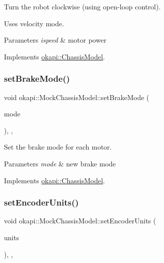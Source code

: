 Turn the robot clockwise (using open-\/loop control). 

Uses velocity mode.


\begin{DoxyParams}{Parameters}
{\em ispeed} & motor power \\
\hline
\end{DoxyParams}


Implements \mbox{\hyperlink{classokapi_1_1ChassisModel_af13aa5281c762eb61a444f0b35176014}{okapi\+::\+Chassis\+Model}}.

\mbox{\label{classokapi_1_1MockChassisModel_abf406acab7b574f508fd50596bb4f97c}} 
\subsubsection{\texorpdfstring{setBrakeMode()}{setBrakeMode()}}
{\footnotesize\ttfamily void okapi\+::\+Mock\+Chassis\+Model\+::set\+Brake\+Mode (\begin{DoxyParamCaption}\item[{\mbox{\hyperlink{classokapi_1_1AbstractMotor_a132e0485dbb59a60c3f934338d8fa601}{Abstract\+Motor\+::brake\+Mode}}}]{mode }\end{DoxyParamCaption})\hspace{0.3cm}{\ttfamily [inline]}, {\ttfamily [override]}, {\ttfamily [virtual]}}



Set the brake mode for each motor. 


\begin{DoxyParams}{Parameters}
{\em mode} & new brake mode \\
\hline
\end{DoxyParams}


Implements \mbox{\hyperlink{classokapi_1_1ChassisModel_a20e3cde96d536e6c722aa5686e5cc8e8}{okapi\+::\+Chassis\+Model}}.

\mbox{\label{classokapi_1_1MockChassisModel_abd9e92455539815d2b855a1bcc64cf6c}} 
\subsubsection{\texorpdfstring{setEncoderUnits()}{setEncoderUnits()}}
{\footnotesize\ttfamily void okapi\+::\+Mock\+Chassis\+Model\+::set\+Encoder\+Units (\begin{DoxyParamCaption}\item[{\mbox{\hyperlink{classokapi_1_1AbstractMotor_ae811cd825099f2defadeb1b7f7e7764c}{Abstract\+Motor\+::encoder\+Units}}}]{units }\end{DoxyParamCaption})\hspace{0.3cm}{\ttfamily [inline]}, {\ttfamily [override]}, {\ttfamily [virtual]}}



